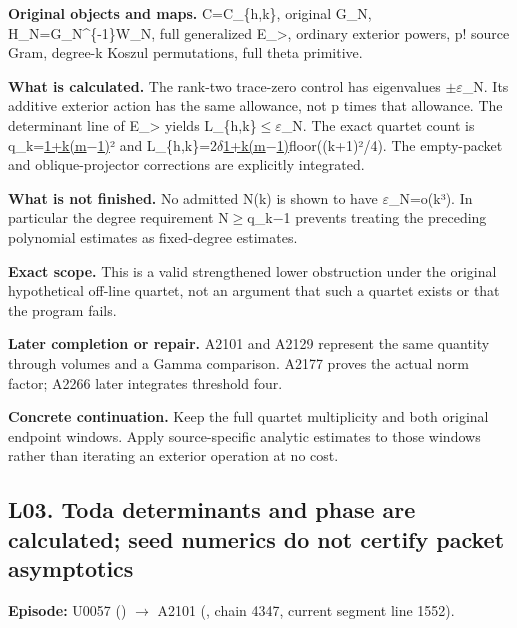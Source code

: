 \documentclass[10pt,a4paper,oneside]{report}
\begin{document}
\textbf{Original objects and maps.} C=C\_\{h,k\}, original G\_N,
H\_N=G\_N\^{}\{-1\}W\_N, full generalized E\_\textgreater, ordinary
exterior powers, p! source Gram, degree-k Koszul permutations, full
theta primitive.

\textbf{What is calculated.} The rank-two trace-zero control has
eigenvalues
\allowbreak{}\ensuremath{±}\allowbreak{}\allowbreak{}\ensuremath{ε}\allowbreak{}\_N.
Its additive exterior action has the same allowance, not p times that
allowance. The determinant line of E\_\textgreater{} yields
L\_\{h,k\}\allowbreak{}\ensuremath{≤}\allowbreak{}\allowbreak{}\ensuremath{ε}\allowbreak{}\_N.
The exact quartet count is
q\_k=\href{k+1}{1+k(m\allowbreak{}\ensuremath{−}\allowbreak{}1)}² and
L\_\{h,k\}=2\allowbreak{}\ensuremath{δ}\allowbreak{}\href{k+1}{1+k(m\allowbreak{}\ensuremath{−}\allowbreak{}1)}floor((k+1)²/4).
The empty-packet and oblique-projector corrections are explicitly
integrated.

\textbf{What is not finished.} No admitted N(k) is shown to have
\allowbreak{}\ensuremath{ε}\allowbreak{}\_N=o(k³). In particular the
degree requirement
N\allowbreak{}\ensuremath{≥}\allowbreak{}q\_k\allowbreak{}\ensuremath{−}\allowbreak{}1
prevents treating the preceding polynomial estimates as fixed-degree
estimates.

\textbf{Exact scope.} This is a valid strengthened lower obstruction
under the original hypothetical off-line quartet, not an argument that
such a quartet exists or that the program fails.

\textbf{Later completion or repair.} A2101 and A2129 represent the same
quantity through volumes and a Gamma comparison. A2177 proves the actual
norm factor; A2266 later integrates threshold four.

\textbf{Concrete continuation.} Keep the full quartet multiplicity and
both original endpoint windows. Apply source-specific analytic estimates
to those windows rather than iterating an exterior operation at no cost.

\subsection{L03. Toda determinants and phase are calculated; seed
numerics do not certify packet
asymptotics}\label{l03.-toda-determinants-and-phase-are-calculated-seed-numerics-do-not-certify-packet-asymptotics}

\textbf{Episode:} U0057
(\protect{})
\allowbreak{}\ensuremath{→}\allowbreak{} A2101
(\protect{}, chain 4347,
current segment line 1552).
\end{document}
